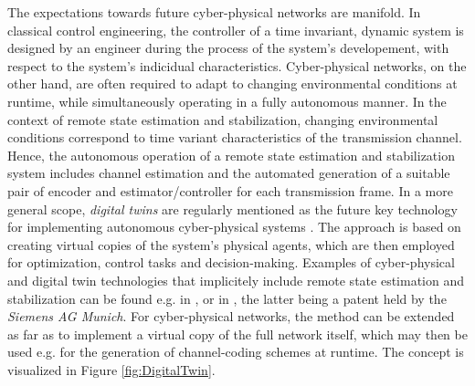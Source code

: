 \documentclass[conference]{IEEEtran}
\newcommand{\revision}[1]{}
\begin{document}
	The expectations towards future cyber-physical networks are manifold. In classical control engineering,
	the controller of a time invariant, dynamic system is designed by an engineer during the process of the system's developement, with respect to the system's indicidual characteristics.
	Cyber-physical networks, on the other hand, are often required to adapt to changing environmental conditions at runtime, while simultaneously operating in a fully autonomous manner.
	In the context of remote state estimation and stabilization, changing environmental conditions correspond to time variant characteristics of the transmission channel.
	Hence, the autonomous operation of a remote state estimation and stabilization system includes channel estimation and the automated generation of a suitable pair of encoder and estimator/controller
	for each transmission frame. In a more general scope, \emph{digital twins} are regularly mentioned as the future key technology for implementing autonomous cyber-physical systems 
	\cite{RaSaKv20,TaZhLiNe19,BaCaFo19,QiTa18,AlEl17}. The approach is based on creating virtual copies of the system's physical agents, which are then employed for optimization, control tasks and 
	decision-making. Examples of cyber-physical and digital twin technologies that implicitely include remote state estimation and stabilization 
	can be found e.g. in \cite{GuSiKuNi18, LiNgLeSoSt16}, or in \cite{Kr16}, the latter being a patent held by the \emph{Siemens AG Munich}. For cyber-physical networks, the method can 
	be extended as far as to implement a virtual copy of the full network itself, which may then be used e.g. for the generation of channel-coding schemes at runtime. The concept is
	visualized in Figure \ref{fig:DigitalTwin}.
	\revision{Are all of these references \cite{RaSaKv20,TaZhLiNe19,BaCaFo19,QiTa18,AlEl17} necessary? Maybe reduce to three.}
	\revision{In the above paragraph, ``cyber-physical, digital twin'' was changed to ``cyber-physical and digital twin'' in order to match the sources. Review consistency of paragraph
	(and introduction as a whole) in view of this.}
\end{document}
